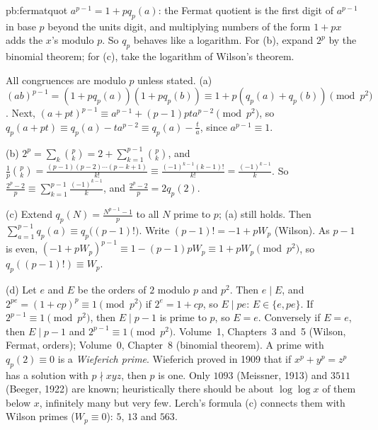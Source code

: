 \begin{solution}{pb:fermatquot}
\idea $a^{p-1}=1+pq_p(a)$: the Fermat quotient is the first digit of $a^{p-1}$ in base $p$ beyond the units digit, and
multiplying numbers of the form $1+px$ adds the $x$'s modulo $p$. So $q_p$ behaves like a logarithm. For (b), expand $2^p$ by the
binomial theorem; for (c), take the logarithm of Wilson's theorem.

\writeup All congruences are modulo $p$ unless stated. (a) $(ab)^{p-1}=(1+pq_p(a))(1+pq_p(b))\equiv1+p(q_p(a)+q_p(b))\pmod{p^2}$. Next,
$(a+pt)^{p-1}\equiv a^{p-1}+(p-1)pta^{p-2}\pmod{p^2}$, so $q_p(a+pt)\equiv q_p(a)-ta^{p-2}\equiv q_p(a)-\frac ta$, since $a^{p-1}\equiv1$.

(b) $2^p=\sum_k\binom pk=2+\sum_{k=1}^{p-1}\binom pk$, and $\frac1p\binom pk=\frac{(p-1)(p-2)\cdots(p-k+1)}{k!}\equiv\frac{(-1)^{k-1}(k-1)!}{k!}=\frac{(-1)^{k-1}}k$.
So $\frac{2^p-2}p\equiv\sum_{k=1}^{p-1}\frac{(-1)^{k-1}}k$, and $\frac{2^p-2}p=2q_p(2)$.

(c) Extend $q_p(N)=\frac{N^{p-1}-1}p$ to all $N$ prime to $p$; (a) still holds. Then
$\sum_{a=1}^{p-1}q_p(a)\equiv q_p\bigl((p-1)!\bigr)$. Write $(p-1)!=-1+pW_p$ (Wilson). As $p-1$ is even,
$(-1+pW_p)^{p-1}\equiv1-(p-1)pW_p\equiv1+pW_p\pmod{p^2}$, so $q_p((p-1)!)\equiv W_p$.

(d) Let $e$ and $E$ be the orders of $2$ modulo $p$ and $p^2$. Then $e\mid E$, and $2^{pe}=(1+cp)^p\equiv1\pmod{p^2}$ if $2^e=1+cp$, so
$E\mid pe$: $E\in\{e,pe\}$. If $2^{p-1}\equiv1\pmod{p^2}$, then $E\mid p-1$ is prime to $p$, so $E=e$. Conversely if $E=e$, then
$E\mid p-1$ and $2^{p-1}\equiv1\pmod{p^2}$.
\tools Volume~1, Chapters~3 and~5 (Wilson, Fermat, orders); Volume~0, Chapter~8 (binomial theorem).
\leads A prime with $q_p(2)\equiv0$ is a \emph{Wieferich prime}. Wieferich proved in 1909 that if $x^p+y^p=z^p$ has a solution with
$p\nmid xyz$, then $p$ is one. Only $1093$ (Meissner, 1913) and $3511$ (Beeger, 1922) are known; heuristically there should be about
$\log\log x$ of them below $x$, infinitely many but very few. Lerch's formula (c) connects them with Wilson primes ($W_p\equiv0$):
$5$, $13$ and $563$.
\end{solution}

